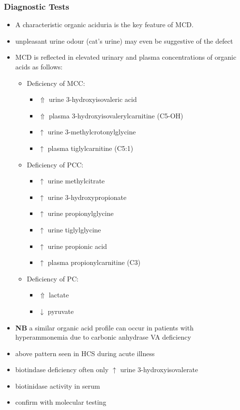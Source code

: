 \documentclass{scrartcl}
\begin{document}
\subsubsection{Diagnostic Tests}
\label{sec:orgb317974}
\begin{itemize}
\item A characteristic organic aciduria is the key feature of MCD.
\item unpleasant urine odour (cat’s urine) may even be suggestive of the
defect
\item MCD is reflected in elevated urinary and plasma concentrations of
organic acids as follows:
\begin{itemize}
\item Deficiency of MCC:
\begin{itemize}
\item \(\Uparrow\) urine 3-hydroxyisovaleric acid
\item \(\Uparrow\) plasma 3-hydroxyisovalerylcarnitine (C5-OH)
\item \(\uparrow\) urine 3-methylcrotonylglycine
\item \(\uparrow\) plasma tiglylcarnitine (C5:1)
\end{itemize}
\item Deficiency of PCC:
\begin{itemize}
\item \(\uparrow\) urine methylcitrate
\item \(\uparrow\) urine 3-hydroxypropionate
\item \(\uparrow\) urine propionylglycine
\item \(\uparrow\) urine tiglylglycine
\item \(\uparrow\) urine propionic acid
\item \(\uparrow\) plasma propionylcarnitine (C3)
\end{itemize}
\item Deficiency of PC:
\begin{itemize}
\item \(\Uparrow\) lactate
\item \(\downarrow\) pyruvate
\end{itemize}
\end{itemize}
\item \textbf{NB} a similar organic acid profile can occur in patients with
hyperammonemia due to carbonic anhydrase VA deficiency

\item above pattern seen in HCS during acute illness
\item biotindase deficiency often only \(\uparrow\) urine 3-hydroxyisovalerate
\item biotinidase activity in serum
\item confirm with molecular testing
\end{itemize}
\end{document}

